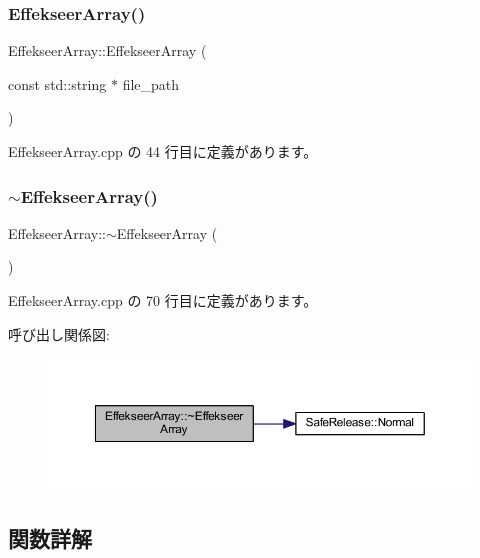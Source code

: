 \subsubsection{\texorpdfstring{Effekseer\+Array()}{EffekseerArray()}}
{\footnotesize\ttfamily Effekseer\+Array\+::\+Effekseer\+Array (\begin{DoxyParamCaption}\item[{const std\+::string $\ast$}]{file\+\_\+path }\end{DoxyParamCaption})}



 Effekseer\+Array.\+cpp の 44 行目に定義があります。

\mbox{\label{class_effekseer_array_af5e7c360c77737f0c46b3a9dad2725ac}} 
\subsubsection{\texorpdfstring{$\sim$\+Effekseer\+Array()}{~EffekseerArray()}}
{\footnotesize\ttfamily Effekseer\+Array\+::$\sim$\+Effekseer\+Array (\begin{DoxyParamCaption}{ }\end{DoxyParamCaption})}



 Effekseer\+Array.\+cpp の 70 行目に定義があります。

呼び出し関係図\+:\nopagebreak
\begin{figure}[H]
\begin{center}
\leavevmode
\includegraphics[width=350pt]{class_effekseer_array_af5e7c360c77737f0c46b3a9dad2725ac_cgraph}
\end{center}
\end{figure}


\subsection{関数詳解}
\mbox{\label{class_effekseer_array_a8c86aa79851ef86f253c13765f708383}} 
